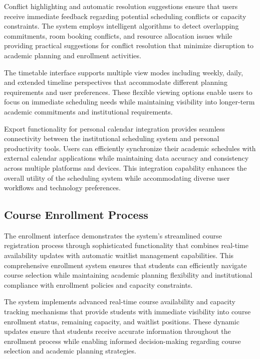 Conflict highlighting and automatic resolution suggestions ensure that users receive immediate feedback regarding potential scheduling conflicts or capacity constraints. The system employs intelligent algorithms to detect overlapping commitments, room booking conflicts, and resource allocation issues while providing practical suggestions for conflict resolution that minimize disruption to academic planning and enrollment activities.

The timetable interface supports multiple view modes including weekly, daily, and extended timeline perspectives that accommodate different planning requirements and user preferences. These flexible viewing options enable users to focus on immediate scheduling needs while maintaining visibility into longer-term academic commitments and institutional requirements.

Export functionality for personal calendar integration provides seamless connectivity between the institutional scheduling system and personal productivity tools. Users can efficiently synchronize their academic schedules with external calendar applications while maintaining data accuracy and consistency across multiple platforms and devices. This integration capability enhances the overall utility of the scheduling system while accommodating diverse user workflows and technology preferences.

\subsection{Course Enrollment Process}

The enrollment interface demonstrates the system's streamlined course registration process through sophisticated functionality that combines real-time availability updates with automatic waitlist management capabilities. This comprehensive enrollment system ensures that students can efficiently navigate course selection while maintaining academic planning flexibility and institutional compliance with enrollment policies and capacity constraints.

The system implements advanced real-time course availability and capacity tracking mechanisms that provide students with immediate visibility into course enrollment status, remaining capacity, and waitlist positions. These dynamic updates ensure that students receive accurate information throughout the enrollment process while enabling informed decision-making regarding course selection and academic planning strategies.

